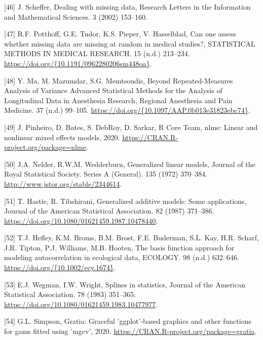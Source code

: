 \documentclass[
]{article}
\begin{document}
\leavevmode\hypertarget{ref-scheffer2002}{}%
{[}46{]} J. Scheffer, Dealing with missing data, Research Letters in the Information and Mathematical Sciences. 3 (2002) 153--160.

\leavevmode\hypertarget{ref-potthoff2006}{}%
{[}47{]} R.F. Potthoff, G.E. Tudor, K.S. Pieper, V. Hasselblad, Can one assess whether missing data are missing at random in medical studies?, STATISTICAL METHODS IN MEDICAL RESEARCH. 15 (n.d.) 213--234. \href{https://doi.org/\%7B10.1191/0962280206sm448oa\%7D}{https://doi.org/\{10.1191/0962280206sm448oa\}}.

\leavevmode\hypertarget{ref-ma2012}{}%
{[}48{]} Y. Ma, M. Mazumdar, S.G. Memtsoudis, Beyond Repeated-Measures Analysis of Variance Advanced Statistical Methods for the Analysis of Longitudinal Data in Anesthesia Research, Regional Anesthesia and Pain Medicine. 37 (n.d.) 99--105. \href{https://doi.org/\%7B10.1097/AAP.0b013e31823ebc74\%7D}{https://doi.org/\{10.1097/AAP.0b013e31823ebc74\}}.

\leavevmode\hypertarget{ref-nlme}{}%
{[}49{]} J. Pinheiro, D. Bates, S. DebRoy, D. Sarkar, R Core Team, nlme: Linear and nonlinear mixed effects models, 2020. \url{https://CRAN.R-project.org/package=nlme}.

\leavevmode\hypertarget{ref-nelder1972}{}%
{[}50{]} J.A. Nelder, R.W.M. Wedderburn, Generalized linear models, Journal of the Royal Statistical Society. Series A (General). 135 (1972) 370--384. \url{http://www.jstor.org/stable/2344614}.

\leavevmode\hypertarget{ref-hastie1987}{}%
{[}51{]} T. Hastie, R. Tibshirani, Generalized additive models: Some applications, Journal of the American Statistical Association. 82 (1987) 371--386. \url{https://doi.org/10.1080/01621459.1987.10478440}.

\leavevmode\hypertarget{ref-hefley2017}{}%
{[}52{]} T.J. Hefley, K.M. Broms, B.M. Brost, F.E. Buderman, S.L. Kay, H.R. Scharf, J.R. Tipton, P.J. Williams, M.B. Hooten, The basis function approach for modeling autocorrelation in ecological data, ECOLOGY. 98 (n.d.) 632--646. \href{https://doi.org/\%7B10.1002/ecy.1674\%7D}{https://doi.org/\{10.1002/ecy.1674\}}.

\leavevmode\hypertarget{ref-wegman1983}{}%
{[}53{]} E.J. Wegman, I.W. Wright, Splines in statistics, Journal of the American Statistical Association. 78 (1983) 351--365. \url{https://doi.org/10.1080/01621459.1983.10477977}.

\leavevmode\hypertarget{ref-gratia}{}%
{[}54{]} G.L. Simpson, Gratia: Graceful 'ggplot'-based graphics and other functions for gams fitted using 'mgcv', 2020. \url{https://CRAN.R-project.org/package=gratia}.
\end{document}

